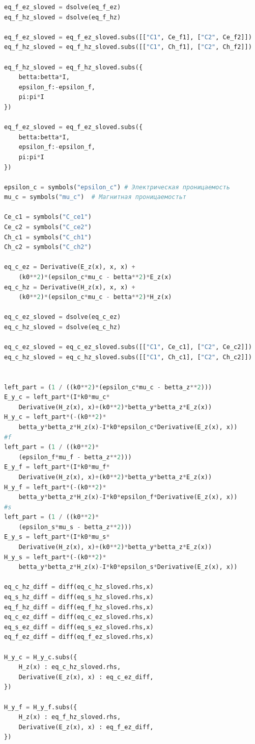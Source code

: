\documentclass{article}
\begin{document}
\begin{lstlisting}[language=Python]
eq_f_ez_sloved = dsolve(eq_f_ez)
eq_f_hz_sloved = dsolve(eq_f_hz)

eq_f_ez_sloved = eq_f_ez_sloved.subs([["C1", Ce_f1], ["C2", Ce_f2]])
eq_f_hz_sloved = eq_f_hz_sloved.subs([["C1", Ch_f1], ["C2", Ch_f2]])

eq_f_hz_sloved = eq_f_hz_sloved.subs({
    betta:betta*I,
    epsilon_f:-epsilon_f,
    pi:pi*I
})

eq_f_ez_sloved = eq_f_ez_sloved.subs({
    betta:betta*I,
    epsilon_f:-epsilon_f,
    pi:pi*I
})

epsilon_c = symbols("epsilon_c") # Электрическая проницаемость
mu_c = symbols("mu_c")  # Магнитная проницаемостьт

Ce_c1 = symbols("C_ce1") 
Ce_c2 = symbols("C_ce2")  
Ch_c1 = symbols("C_ch1") 
Ch_c2 = symbols("C_ch2")  

eq_c_ez = Derivative(E_z(x), x, x) +
    (k0**2)*(epsilon_c*mu_c - betta**2)*E_z(x)
eq_c_hz = Derivative(H_z(x), x, x) +
    (k0**2)*(epsilon_c*mu_c - betta**2)*H_z(x)

eq_c_ez_sloved = dsolve(eq_c_ez)
eq_c_hz_sloved = dsolve(eq_c_hz)

eq_c_ez_sloved = eq_c_ez_sloved.subs([["C1", Ce_c1], ["C2", Ce_c2]])
eq_c_hz_sloved = eq_c_hz_sloved.subs([["C1", Ch_c1], ["C2", Ch_c2]])


left_part = (1 / ((k0**2)*(epsilon_c*mu_c - betta_z**2)))
E_y_c = left_part*(I*k0*mu_c*
    Derivative(H_z(x), x)+(k0**2)*betta_y*betta_z*E_z(x))
H_y_c = left_part*(-(k0**2)*
    betta_y*betta_z*H_z(x)-I*k0*epsilon_c*Derivative(E_z(x), x))
#f
left_part = (1 / ((k0**2)*
    (epsilon_f*mu_f - betta_z**2)))
E_y_f = left_part*(I*k0*mu_f*
    Derivative(H_z(x), x)+(k0**2)*betta_y*betta_z*E_z(x))
H_y_f = left_part*(-(k0**2)*
    betta_y*betta_z*H_z(x)-I*k0*epsilon_f*Derivative(E_z(x), x))
#s
left_part = (1 / ((k0**2)*
    (epsilon_s*mu_s - betta_z**2)))
E_y_s = left_part*(I*k0*mu_s*
    Derivative(H_z(x), x)+(k0**2)*betta_y*betta_z*E_z(x))
H_y_s = left_part*(-(k0**2)*
    betta_y*betta_z*H_z(x)-I*k0*epsilon_s*Derivative(E_z(x), x))

eq_c_hz_diff = diff(eq_c_hz_sloved.rhs,x)
eq_s_hz_diff = diff(eq_s_hz_sloved.rhs,x)
eq_f_hz_diff = diff(eq_f_hz_sloved.rhs,x)
eq_c_ez_diff = diff(eq_c_ez_sloved.rhs,x)
eq_s_ez_diff = diff(eq_s_ez_sloved.rhs,x)
eq_f_ez_diff = diff(eq_f_ez_sloved.rhs,x)

H_y_c = H_y_c.subs({
    H_z(x) : eq_c_hz_sloved.rhs,
    Derivative(E_z(x), x) : eq_c_ez_diff,
})

H_y_f = H_y_f.subs({
    H_z(x) : eq_f_hz_sloved.rhs,
    Derivative(E_z(x), x) : eq_f_ez_diff,
})


\end{lstlisting}
\end{document}
